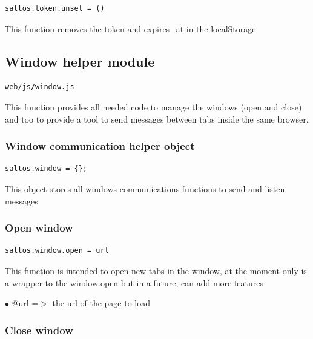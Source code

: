 \documentclass[a4paper]{article}
\begin{document}
\begin{lstlisting}
saltos.token.unset = ()
\end{lstlisting}

This function removes the token and expires\_at in the localStorage

\hypertarget{toc303}{}
\subsection{Window helper module}

\begin{lstlisting}
web/js/window.js
\end{lstlisting}

This function provides all needed code to manage the windows (open and close) and too
to provide a tool to send messages between tabs inside the same browser.

\hypertarget{toc304}{}
\subsubsection{Window communication helper object}

\begin{lstlisting}
saltos.window = {};
\end{lstlisting}

This object stores all windows communications functions to send and listen messages

\hypertarget{toc305}{}
\subsubsection{Open window}

\begin{lstlisting}
saltos.window.open = url
\end{lstlisting}

This function is intended to open new tabs in the window, at the moment only is a wrapper to
the window.open but in a future, can add more features

\begin{compactitem}
\item[\color{myblue}$\bullet$] @url =$>$ the url of the page to load
\end{compactitem}

\hypertarget{toc306}{}
\subsubsection{Close window}
\end{document}
